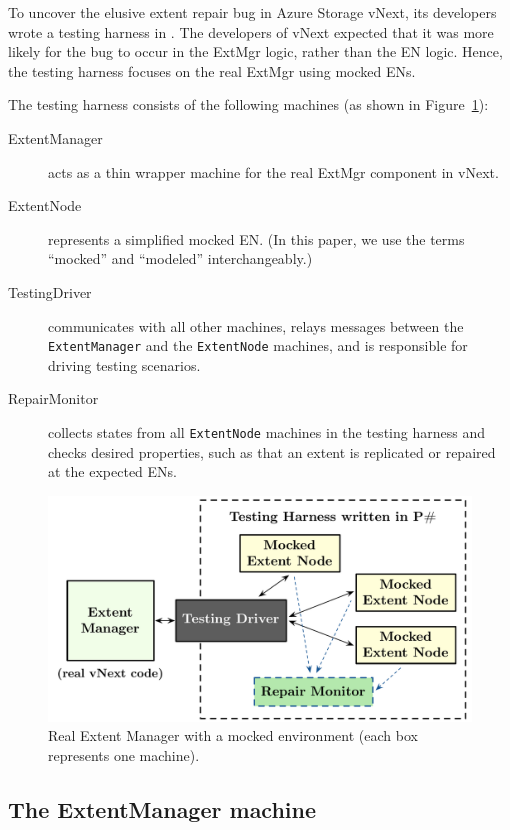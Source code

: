 To uncover the elusive extent repair bug in Azure Storage vNext, its developers wrote a testing harness in \psharp. The developers of vNext expected that it was more likely for the bug to occur in the ExtMgr logic, rather than the EN logic. Hence, the testing harness focuses on the real ExtMgr using mocked ENs.

The testing harness consists of the following \psharp machines (as shown in Figure~\ref{fig:azurestoremodel}):
\begin{description}
\item[ExtentManager] acts as a thin wrapper machine for the real ExtMgr component in vNext.
\item[ExtentNode] represents a simplified mocked EN. (In this paper, we use the terms ``mocked'' and ``modeled'' interchangeably.)
\item[TestingDriver] communicates with all other machines, relays messages between the \texttt{ExtentManager} and the \texttt{ExtentNode} machines, and is responsible for driving testing scenarios.
\item[RepairMonitor] collects states from all \texttt{ExtentNode} machines in the testing harness and checks desired properties, such as that an extent is replicated or repaired at the expected ENs.
\end{description}


\begin{figure}[t]
\centering
\includegraphics[width=\linewidth]{img/mocked_vnext}
\caption{Real Extent Manager with a mocked environment (each box represents one \psharp machine).}
\label{fig:azurestoremodel}
\end{figure}

\subsection{The ExtentManager machine}
\label{sec:method:wrap_target}


